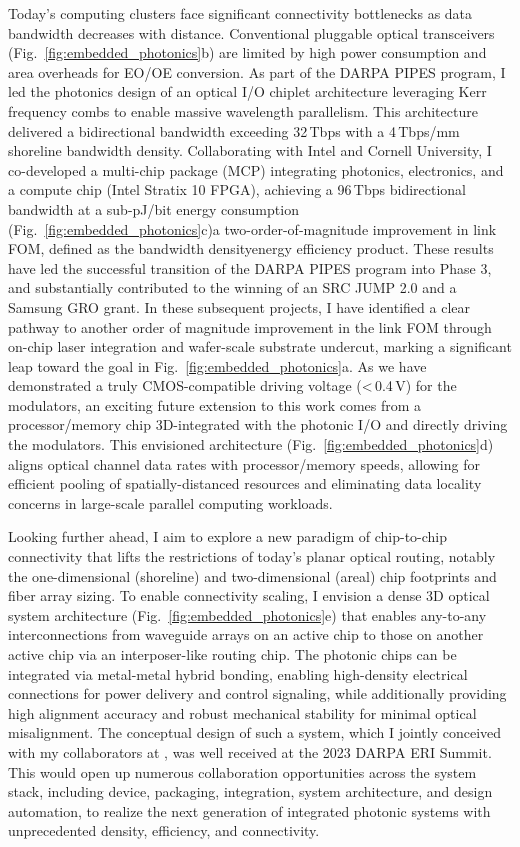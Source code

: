 Today's computing clusters face significant connectivity bottlenecks as data bandwidth decreases with distance. Conventional pluggable optical transceivers (Fig.~\ref{fig:embedded_photonics}b) are limited by high power consumption and area overheads for EO/OE conversion. As part of the DARPA PIPES program, I led the photonics design of an optical I/O chiplet architecture leveraging Kerr frequency combs to enable massive wavelength parallelism. This architecture delivered a bidirectional bandwidth exceeding 32\,Tbps with a 4\,Tbps/mm shoreline bandwidth density. Collaborating with Intel and Cornell University, I co-developed a multi-chip package (MCP) integrating photonics, electronics, and a compute chip (Intel Stratix 10 FPGA), achieving a 96\,Tbps bidirectional bandwidth at a sub-pJ/bit energy consumption (Fig.~\ref{fig:embedded_photonics}c)\textemdash{}a two-order-of-magnitude improvement in link FOM, defined as the bandwidth density\textendash{}energy efficiency product. These results have led the successful transition of the DARPA PIPES program into Phase 3, and substantially contributed to the winning of an SRC JUMP 2.0 and a Samsung GRO grant. In these subsequent projects, I have identified a clear pathway to another order of magnitude improvement in the link FOM through on-chip laser integration and wafer-scale substrate undercut, marking a significant leap toward the goal in Fig.~\ref{fig:embedded_photonics}a. As we have demonstrated a truly CMOS-compatible driving voltage (<\,0.4\,V) for the modulators, an exciting future extension to this work comes from a processor/memory chip 3D-integrated with the photonic I/O and directly driving the modulators. This envisioned architecture (Fig.~\ref{fig:embedded_photonics}d) aligns optical channel data rates with processor/memory speeds, allowing for efficient pooling of spatially-distanced resources and eliminating data locality concerns in large-scale parallel computing workloads.

Looking further ahead, I aim to explore a new paradigm of chip-to-chip connectivity that lifts the restrictions of today's planar optical routing, notably the one-dimensional (shoreline) and two-dimensional (areal) chip footprints and fiber array sizing. To enable connectivity scaling, I envision a dense 3D optical system architecture (Fig.~\ref{fig:embedded_photonics}e) that enables any-to-any interconnections from waveguide arrays on an active chip to those on another active chip via an interposer-like routing chip. The photonic chips can be integrated via metal-metal hybrid bonding, enabling high-density electrical connections for power delivery and control signaling, while
additionally providing high alignment accuracy and robust mechanical stability for minimal optical misalignment. The conceptual design of such a system, which I jointly conceived with my collaborators at \mySchoolShort{},
was well received at the 2023 DARPA ERI Summit. This would open up numerous collaboration opportunities across the system stack, including device, packaging, integration, system architecture, and design automation, to realize the next generation of integrated photonic systems with unprecedented density, efficiency, and connectivity.

